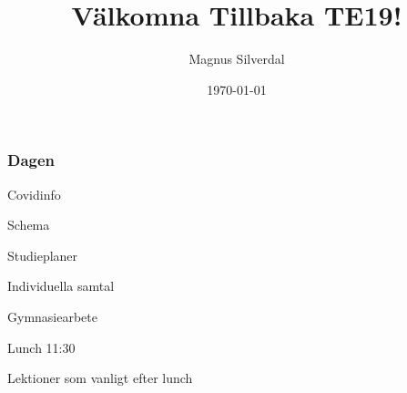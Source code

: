 \documentclass[11pt]{beamer}
\title{Välkomna Tillbaka TE19!}
\author{Magnus Silverdal}
\institute{NTI Gymnasiet}
\date{\today}
\begin{document}
    \frame{\titlepage}

    \begin{frame}
        \frametitle{Dagen}
        \begin{enumeration}
            \item Covidinfo
            \item Schema
            \item Studieplaner
            \item Individuella samtal
            \item Gymnasiearbete
            \item Lunch 11:30
            \item Lektioner som vanligt efter lunch
        \end{enumeration}
    \end{frame}
\end{document}
